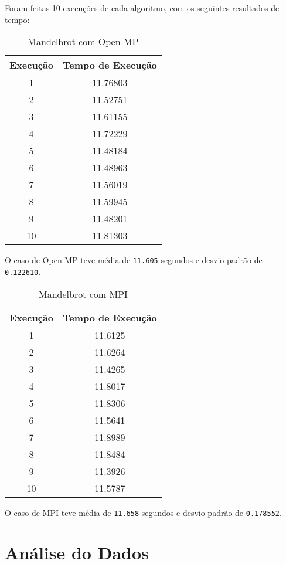 \documentclass[10pt,a4paper]{article}
\begin{document}
		Foram feitas 10 execuções de cada algoritmo, com os seguintes resultados de tempo:

		\begin{table}[htb]
			\begin{tabular}{|c|c|}
				\hline
				Execução & Tempo de Execução\\ \hline
				1  & 11.76803 \\ \hline
				2  & 11.52751 \\ \hline
				3  & 11.61155 \\ \hline
				4  & 11.72229 \\ \hline
				5  & 11.48184 \\ \hline
				6  & 11.48963 \\ \hline
				7  & 11.56019 \\ \hline
				8  & 11.59945 \\ \hline
				9  & 11.48201 \\ \hline
				10 & 11.81303 \\ \hline
			\end{tabular}
			\caption{Mandelbrot com Open MP}
		\end{table}
		O caso de Open MP teve média de \texttt{11.605} segundos e desvio padrão de \texttt{0.122610}.

		\begin{table}[htb]
			\begin{tabular}{|c|c|}
				\hline
				Execução & Tempo de Execução\\ \hline
				1  & 11.6125 \\ \hline
				2  & 11.6264 \\ \hline
				3  & 11.4265 \\ \hline
				4  & 11.8017 \\ \hline
				5  & 11.8306 \\ \hline
				6  & 11.5641 \\ \hline
				7  & 11.8989 \\ \hline
				8  & 11.8484 \\ \hline
				9  & 11.3926 \\ \hline
				10 & 11.5787 \\ \hline
			\end{tabular}
			\caption{Mandelbrot com MPI}
		\end{table}
		O caso de MPI teve média de \texttt{11.658} segundos e desvio padrão de \texttt{0.178552}.

	\clearpage
	\section{Análise do Dados}
\end{document}
